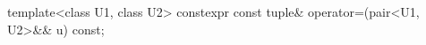 \documentclass{wg21}
\begin{document}
%
%
%

%
%
%

%
\begin{itemdecl}
    template<class U1, class U2> constexpr const tuple& operator=(pair<U1, U2>&& u) const;
\end{itemdecl}
\end{document}
